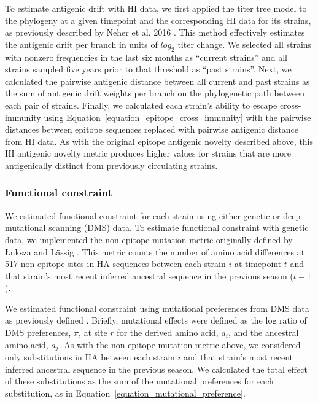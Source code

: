 To estimate antigenic drift with HI data, we first applied the titer tree model to the phylogeny at a given timepoint and the corresponding HI data for its strains, as previously described by Neher et al. 2016 \cite{Neher:2016hy}.
This method effectively estimates the antigenic drift per branch in units of $log_{2}$ titer change.
We selected all strains with nonzero frequencies in the last six months as ``current strains'' and all strains sampled five years prior to that threshold as ``past strains''.
Next, we calculated the pairwise antigenic distance between all current and past strains as the sum of antigenic drift weights per branch on the phylogenetic path between each pair of strains.
Finally, we calculated each strain's ability to escape cross-immunity using Equation~\ref{equation_epitope_cross_immunity} with the pairwise distances between epitope sequences replaced with pairwise antigenic distance from HI data.
As with the original epitope antigenic novelty described above, this HI antigenic novelty metric produces higher values for strains that are more antigenically distinct from previously circulating strains.

\subsubsection*{Functional constraint}

We estimated functional constraint for each strain using either genetic or deep mutational scanning (DMS) data.
To estimate functional constraint with genetic data, we implemented the non-epitope mutation metric originally defined by {\L}uksza and L\"assig \cite{Luksza:2014hj}.
This metric counts the number of amino acid differences at 517 non-epitope sites in HA sequences between each strain $i$ at timepoint $t$ and that strain's most recent inferred ancestral sequence in the previous season ($t - 1$).

We estimated functional constraint using mutational preferences from DMS data as previously defined \cite{Lee2018}.
Briefly, mutational effects were defined as the log ratio of DMS preferences, $\pi$, at site $r$ for the derived amino acid, $a_{i}$, and the ancestral amino acid, $a_{j}$.
As with the non-epitope mutation metric above, we considered only substitutions in HA between each strain $i$ and that strain's most recent inferred ancestral sequence in the previous season.
We calculated the total effect of these substitutions as the sum of the mutational preferences for each substitution, as in Equation~\ref{equation_mutational_preference}.

